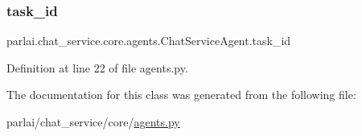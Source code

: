 \subsubsection{\texorpdfstring{task\+\_\+id}{task\_id}}
{\footnotesize\ttfamily parlai.\+chat\+\_\+service.\+core.\+agents.\+Chat\+Service\+Agent.\+task\+\_\+id}



Definition at line 22 of file agents.\+py.



The documentation for this class was generated from the following file\+:\begin{DoxyCompactItemize}
\item 
parlai/chat\+\_\+service/core/\hyperlink{parlai_2chat__service_2core_2agents_8py}{agents.\+py}\end{DoxyCompactItemize}

